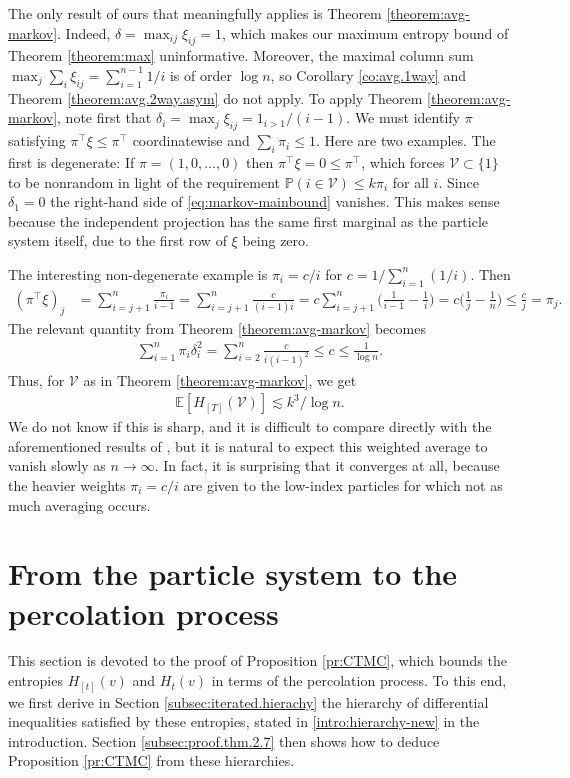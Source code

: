 \documentclass[11pt,reqno]{amsart}
\numberwithin{equation}{section}
\theoremstyle{definition}
\def\E{{\mathbb E}}
\def\PP{{\mathbb P}}
\def\V{{\mathcal V}}
\begin{document}
The only result of ours that meaningfully applies is Theorem \ref{theorem:avg-markov}. Indeed, $\delta=\max_{ij}\xi_{ij}= 1$, which makes our maximum entropy bound of Theorem \ref{theorem:max} uninformative. 
Moreover, the maximal column sum $\max_j\sum_i\xi_{ij}=\sum_{i=1}^{n-1}1/i$ is of order $\log n$, so Corollary \ref{co:avg.1way} and Theorem \ref{theorem:avg.2way.asym} do not apply.
To apply Theorem \ref{theorem:avg-markov}, note first that $\delta_i=\max_j \xi_{ij} = 1_{i > 1}/(i-1)$. We must identify $\pi$ satisfying $\pi^\top \xi \le \pi^\top$ coordinatewise and $\sum_i \pi_i \le 1$.
Here are two examples. The first is degenerate: If $\pi=(1,0,\ldots,0)$ then $\pi^\top \xi = 0 \le \pi^\top$, which forces $\V\subset \{1\}$ to be nonrandom in light of the requirement $\PP(i \in \V) \le k\pi_i$ for all $i$. Since $\delta_1=0$ the right-hand side of \eqref{eq:markov-mainbound} vanishes. This makes sense because the independent projection has the same first marginal as the particle system itself, due to the first row of $\xi$ being zero.

The interesting non-degenerate example is $\pi_i=c/i$ for $c=1/\sum_{i=1}^n (1/i)$.
Then
\begin{align*}
(\pi^\top \xi)_j &=	\sum_{i=j+1}^{n} \frac{\pi_i}{i-1} =  \sum_{i=j+1}^{n } \frac{c}{(i-1)i} = c\sum_{i=j+1}^{n }\bigg(\frac{1}{i-1} - \frac{1}{i} \bigg)  = c\bigg(\frac{1}{j} - \frac{1}{n }\bigg) \le \frac{c}{j}=\pi_j.
\end{align*}
The relevant quantity from Theorem \ref{theorem:avg-markov} becomes
\begin{align*}
\sum_{i=1}^n\pi_i \delta_i^2 = \sum_{i=2}^{n }\frac{c}{i(i-1)^2} \le c \le \frac{1}{\log n}.
\end{align*}
Thus, for $\V$ as in Theorem \ref{theorem:avg-markov}, we get
\begin{align*}
	\E[H_{[T]}(\V)] \lesssim  k^3/\log n .
\end{align*}
We do not know if this is sharp, and it is difficult to compare directly with the aforementioned results of \cite{du2023sequential}, but it is natural to expect this weighted average to vanish slowly as $n\to\infty$. In fact, it is surprising that it converges at all, because the heavier weights $\pi_i=c/i$ are given to the low-index particles for which not as much averaging occurs.




\section{From the particle system to the percolation process} \label{se:hierarchyproofs}
This section is devoted to the proof of Proposition \ref{pr:CTMC}, which bounds the entropies $H_{[t]}(v)$ and $H_{t}(v)$ in terms of the percolation process. To this end, we first derive in Section \ref{subsec:iterated.hierachy} the hierarchy of differential inequalities satisfied by these entropies, stated in \eqref{intro:hierarchy-new} in the introduction. Section \ref{subsec:proof.thm.2.7} then shows how to deduce Proposition \ref{pr:CTMC} from these hierarchies.  
\end{document}
